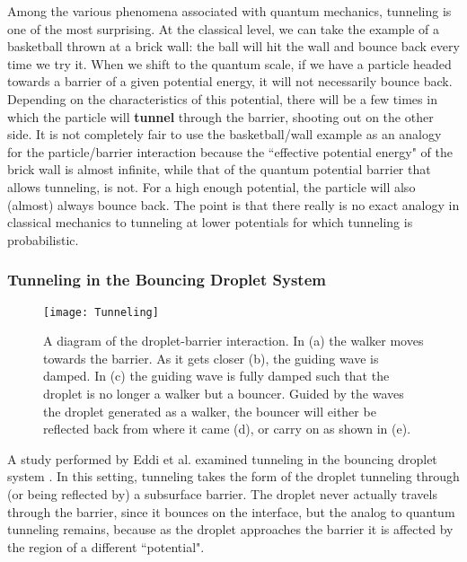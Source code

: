 Among the various phenomena associated with quantum mechanics, tunneling is one of the most surprising. At the classical level, we can take the example of a basketball thrown at a brick wall: the ball will hit the wall and bounce back every time we try it. When we shift to the quantum scale, if we have a particle headed towards a barrier of a given potential energy, it will not necessarily bounce back. Depending on the characteristics of this potential, there will be a few times in which the particle will \textbf{tunnel} through the barrier, shooting out on the other side. It is not completely fair to use the basketball/wall example as an analogy for the particle/barrier interaction because the ``effective potential energy" of the brick wall is almost infinite, while that of the quantum potential barrier that allows tunneling, is not. For a high enough potential, the particle will also (almost) always bounce back. The point is that there really is no exact analogy in classical mechanics to tunneling at lower potentials for which tunneling is probabilistic. 

    \subsubsection{Tunneling in the Bouncing Droplet System}

\begin{figure}[h!]
 \centering
	    \texttt{[image: Tunneling]}
	     \caption{A diagram of the droplet-barrier interaction. In (a) the walker moves towards the barrier. As it gets closer (b), the guiding wave is damped. In (c) the guiding wave is fully damped such that the droplet is no longer a walker but a bouncer. Guided by the waves the droplet generated as a walker, the bouncer will either be reflected back from where it came (d), or carry on as shown in (e).}
	 \label{tuncartoon}
	\end{figure}
	A study performed by Eddi et al. examined tunneling in the bouncing droplet system \cite{tunneling}. In this setting, tunneling takes the form of the droplet tunneling through (or being reflected by) a subsurface barrier. The droplet never actually travels through the barrier, since it bounces on the interface, but the analog to quantum tunneling remains, because as the droplet approaches the barrier it is affected by the region of a different ``potential". 
	
